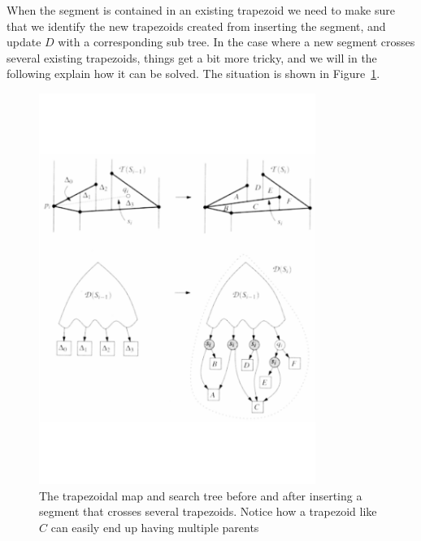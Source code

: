 When the segment is contained in an existing trapezoid we need to make sure that we identify the new trapezoids created from inserting the segment, and update $D$ with a corresponding sub tree. In the case where a new segment crosses several existing trapezoids, things get a bit more tricky, and we will in the following explain how it can be solved. The situation is shown in Figure~\ref{fig:intersecting_segments}.

\begin{figure}[]
    \centering
      \includegraphics[width=90mm]{images/intersecting_and_tree.pdf}
    \caption{The trapezoidal map and search tree before and after inserting a segment that crosses several trapezoids. Notice how a trapezoid like $C$ can easily end up having multiple parents}
    \label{fig:intersecting_segments}
\end{figure}


